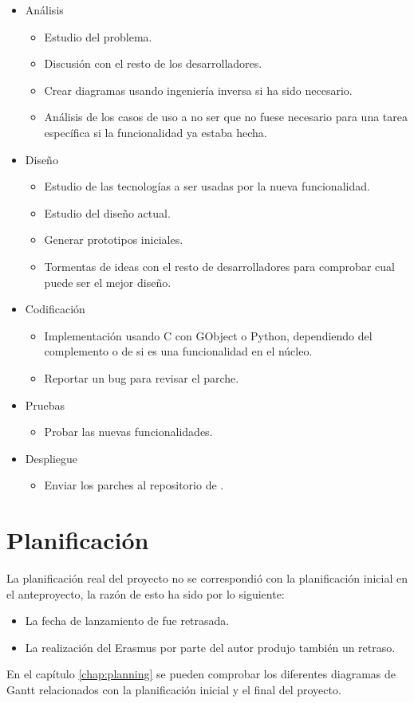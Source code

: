 \begin{itemize}
  \item Análisis
    \begin{itemize}
      \item Estudio del problema.
      \item Discusión con el resto de los desarrolladores.
      \item Crear diagramas usando ingeniería inversa si ha sido necesario.
      \item Análisis de los casos de uso a no ser que no fuese necesario para una tarea específica si la funcionalidad ya estaba hecha.
    \end{itemize}
  \item Diseño
    \begin{itemize}
      \item Estudio de las tecnologías a ser usadas por la nueva funcionalidad.
      \item Estudio del diseño actual.
      \item Generar prototipos iniciales.
      \item Tormentas de ideas con el resto de desarrolladores para comprobar cual puede ser el mejor diseño.
    \end{itemize}
  \item Codificación
    \begin{itemize}
      \item Implementación usando C con GObject o Python, dependiendo del complemento o de si es una funcionalidad en el núcleo.
      \item Reportar un bug para revisar el parche.
    \end{itemize}
  \item Pruebas
    \begin{itemize}
      \item Probar las nuevas funcionalidades.
    \end{itemize}
  \item Despliegue
    \begin{itemize}
      \item Enviar los parches al repositorio de \GNOME.
    \end{itemize}
\end{itemize}

\section{Planificación}

La planificación real del proyecto no se correspondió con la planificación
inicial en el anteproyecto, la razón de esto ha sido por lo siguiente:

\begin{itemize}
  \item La fecha de lanzamiento de \GNOME fue retrasada.
  \item La realización del Erasmus por parte del autor produjo también un retraso.
\end{itemize}

En el capítulo \ref{chap:planning} se pueden comprobar los diferentes diagramas
de Gantt relacionados con la planificación inicial y el final del proyecto.


